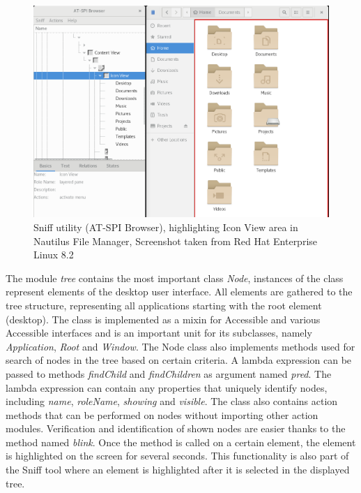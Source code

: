 \begin{figure}[h]
	\centering
	\includegraphics[width=1\textwidth]{obrazky-figures/sniff.png}
	\caption{Sniff utility (AT-SPI Browser), highlighting Icon View area in Nautilus File Manager, Screenshot taken from Red Hat Enterprise Linux 8.2}
	\label{sniff}
\end{figure}

The module \textit{tree} contains the most important class \textit{Node}, instances of the class represent elements of the desktop user interface. All elements are gathered to the tree structure, representing all applications starting with the root element (desktop). The class is implemented as a mixin for Accessible and various Accessible interfaces and is an important unit for its subclasses, namely \textit{Application}, \textit{Root} and \textit{Window}. The Node class also implements methods used for search of nodes in the tree based on certain criteria. A lambda expression can be passed to methods \textit{findChild} and \textit{findChildren} as argument named \textit{pred}. The lambda expression can contain any properties that uniquely identify nodes, including \textit{name}, \textit{roleName},  \textit{showing} and \textit{visible}. The class also contains action methods that can be performed on nodes without importing other action modules. Verification and identification of shown nodes are easier thanks to the method named \textit{blink}. Once the method is called on a certain element, the element is highlighted on the screen for several seconds. This functionality is also part of the Sniff tool where an element is highlighted after it is selected in the displayed tree.

